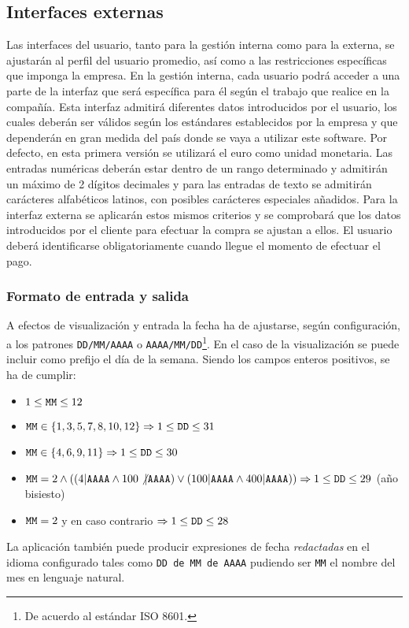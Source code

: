 \documentclass[11pt, a4paper, twoside, titlepage]{article}
\begin{document}
		\subsection{Interfaces externas}
			Las interfaces del usuario, tanto para la gestión interna como para la externa, se ajustarán al perfil del usuario promedio, así como a las restricciones específicas que imponga la empresa. En la gestión interna, cada usuario podrá acceder a una parte de la interfaz que será específica para él según el trabajo que realice en la compañía. Esta interfaz admitirá diferentes datos introducidos por el usuario, los cuales deberán ser válidos según los estándares establecidos por la empresa y que dependerán en gran medida del país donde se vaya a utilizar este software. Por defecto, en esta primera versión se utilizará el euro como unidad monetaria. Las entradas numéricas deberán estar dentro de un rango determinado y admitirán un máximo de 2 dígitos decimales y para las entradas de texto se admitirán carácteres alfabéticos latinos, con posibles carácteres especiales añadidos. Para la interfaz externa se aplicarán estos mismos criterios y se comprobará que los datos introducidos por el cliente para efectuar la compra se ajustan a ellos. El usuario deberá identificarse obligatoriamente cuando llegue el momento de efectuar el pago.
			

		\subsubsection{Formato de entrada y salida}

				A efectos de visualización y entrada la fecha ha de ajustarse, según configuración, a los patrones \verb|DD/MM/AAAA| o \verb|AAAA/MM/DD|\footnote{De acuerdo al estándar ISO 8601.}. En el caso de la visualización se puede incluir como prefijo el día de la semana. Siendo los campos enteros positivos, se ha de cumplir:
				\begin{itemize}
					\item $1 \leq \verb|MM| \leq 12$
					\item $\verb|MM| \in \{1, 3, 5, 7, 8, 10, 12\} \Rightarrow 1 \leq \verb|DD| \leq 31$
					\item $\verb|MM| \in \{4, 6, 9, 11\} \Rightarrow 1 \leq \verb|DD| \leq 30$ 
					\item $\verb|MM| = 2 \wedge ((4 | \verb|AAAA| \wedge 100 \not| \verb|AAAA|) \vee (100 | \verb|AAAA| \wedge 400 | \verb|AAAA|)) \Rightarrow 1 \leq \verb|DD| \leq 29$ (año bisiesto)
					\item $\verb|MM| = 2$ y en caso contrario $\Rightarrow 1 \leq \verb|DD| \leq 28$
				\end{itemize}
			La aplicación también puede producir expresiones de fecha \textit{redactadas} en el idioma configurado tales como \verb|DD de MM de AAAA| pudiendo ser \verb|MM| el nombre del mes en lenguaje natural.\\
\end{document}
